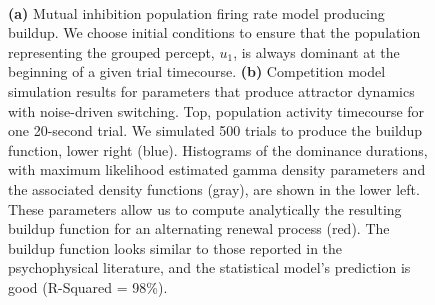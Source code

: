 \documentclass{frontiersSCNS} %
\begin{document}
\begin{figure}
	\centering
	 \\
	\vspace{20 pt}
	
	\caption{\textbf{(a)} Mutual inhibition population firing rate model producing buildup. We choose initial conditions to ensure that the population representing the grouped percept, $u_1$, is always dominant at the beginning of a given trial timecourse. \textbf{(b)} Competition model simulation results for parameters that produce attractor dynamics with noise-driven switching. Top, population activity timecourse for one 20-second trial. We simulated 500 trials to produce the buildup function, lower right (blue). Histograms of the dominance durations, with maximum likelihood estimated gamma density parameters and the associated density functions (gray), are shown in the lower left. These parameters allow us to compute analytically the resulting buildup function for an alternating renewal process (red).  The buildup function looks similar to those reported in the psychophysical literature, and the statistical model's prediction is good (R-Squared = 98\%).}
	\label{fig:making_comp_BUFs}
\end{figure}
\end{document}
